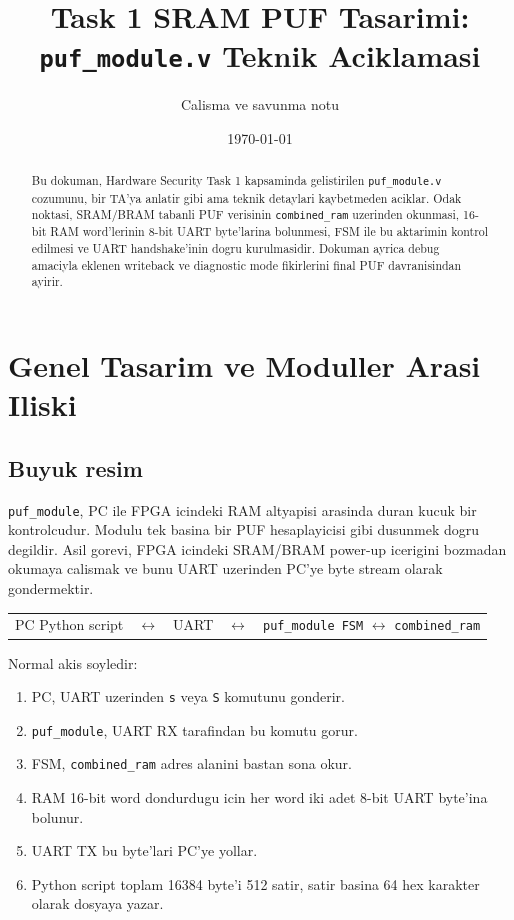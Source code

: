 \documentclass[11pt,a4paper]{article}
\title{\textbf{Task 1 SRAM PUF Tasarimi: \texttt{puf\_module.v} Teknik Aciklamasi}}
\author{Calisma ve savunma notu}
\date{\today}
\begin{document}
\maketitle

\begin{abstract}
Bu dokuman, Hardware Security Task 1 kapsaminda gelistirilen \texttt{puf\_module.v} cozumunu, bir TA'ya anlatir gibi ama teknik detaylari kaybetmeden aciklar. Odak noktasi, SRAM/BRAM tabanli PUF verisinin \texttt{combined\_ram} uzerinden okunmasi, 16-bit RAM word'lerinin 8-bit UART byte'larina bolunmesi, FSM ile bu aktarimin kontrol edilmesi ve UART handshake'inin dogru kurulmasidir. Dokuman ayrica debug amaciyla eklenen writeback ve diagnostic mode fikirlerini final PUF davranisindan ayirir.
\end{abstract}

\tableofcontents
\newpage

\section{Genel Tasarim ve Moduller Arasi Iliski}

\subsection{Buyuk resim}
\texttt{puf\_module}, PC ile FPGA icindeki RAM altyapisi arasinda duran kucuk bir kontrolcudur. Modulu tek basina bir PUF hesaplayicisi gibi dusunmek dogru degildir. Asil gorevi, FPGA icindeki SRAM/BRAM power-up icerigini bozmadan okumaya calismak ve bunu UART uzerinden PC'ye byte stream olarak gondermektir.

\begin{center}
\begin{tabular}{c c c c c}
PC Python script & $\longleftrightarrow$ & UART & $\longleftrightarrow$ & \texttt{puf\_module FSM} $\longleftrightarrow$ \texttt{combined\_ram} \\
\end{tabular}
\end{center}

Normal akis soyledir:
\begin{enumerate}
  \item PC, UART uzerinden \texttt{s} veya \texttt{S} komutunu gonderir.
  \item \texttt{puf\_module}, UART RX tarafindan bu komutu gorur.
  \item FSM, \texttt{combined\_ram} adres alanini bastan sona okur.
  \item RAM 16-bit word dondurdugu icin her word iki adet 8-bit UART byte'ina bolunur.
  \item UART TX bu byte'lari PC'ye yollar.
  \item Python script toplam 16384 byte'i 512 satir, satir basina 64 hex karakter olarak dosyaya yazar.
\end{enumerate}
\end{document}
